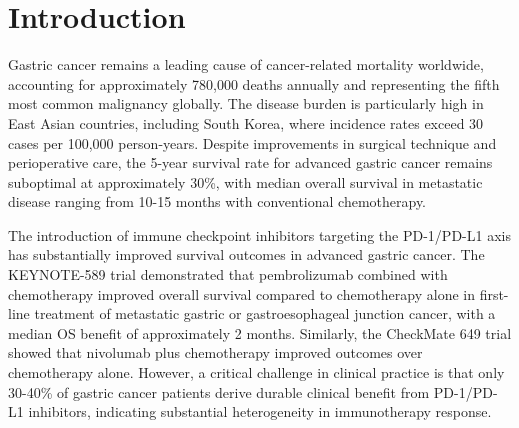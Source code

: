 \documentclass[12pt,twoside]{article}
\begin{document}
\begin{abstract}
\noindent \textbf{Conclusions:} SPP1+ macrophages and T cell exhaustion represent actionable biomarkers for gastric cancer patient stratification and predict poor immunotherapy response. These findings suggest SPP1 and cancer-associated fibroblasts as therapeutic targets to enhance immunotherapy efficacy.

\noindent \textbf{Keywords:} gastric cancer, tumor microenvironment, macrophages, single-cell RNA-sequencing, immunotherapy response, osteopontin, T cell exhaustion, fibroblasts, biomarker

\end{abstract}

\clearpage


\section{Introduction}

Gastric cancer remains a leading cause of cancer-related mortality worldwide, accounting for approximately 780,000 deaths annually and representing the fifth most common malignancy globally. The disease burden is particularly high in East Asian countries, including South Korea, where incidence rates exceed 30 cases per 100,000 person-years. Despite improvements in surgical technique and perioperative care, the 5-year survival rate for advanced gastric cancer remains suboptimal at approximately 30\%, with median overall survival in metastatic disease ranging from 10-15 months with conventional chemotherapy.

The introduction of immune checkpoint inhibitors targeting the PD-1/PD-L1 axis has substantially improved survival outcomes in advanced gastric cancer. The KEYNOTE-589 trial demonstrated that pembrolizumab combined with chemotherapy improved overall survival compared to chemotherapy alone in first-line treatment of metastatic gastric or gastroesophageal junction cancer, with a median OS benefit of approximately 2 months. Similarly, the CheckMate 649 trial showed that nivolumab plus chemotherapy improved outcomes over chemotherapy alone. However, a critical challenge in clinical practice is that only 30-40\% of gastric cancer patients derive durable clinical benefit from PD-1/PD-L1 inhibitors, indicating substantial heterogeneity in immunotherapy response.
\end{document}
